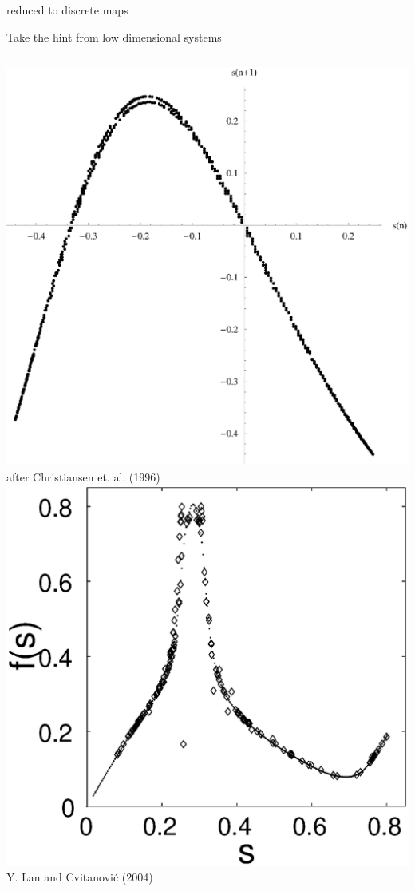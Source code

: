 \documentclass{beamer}
\begin{document}
\begin{frame}{{\KSe} reduced to discrete maps}
  \begin{block}{Take the hint from low dimensional systems}
  \begin{columns}
	\includegraphics[width=\textwidth,clip=true]{../../figs/sPoincarePlot.eps}\\
	after Christiansen et. al. (1996)
	\includegraphics[width=\textwidth,clip=true]{../../figs/lanRM}\\
	Y. Lan and Cvitanovi\'c (2004)
 \end{columns}
 \end{block}
\end{frame}
\end{document}
